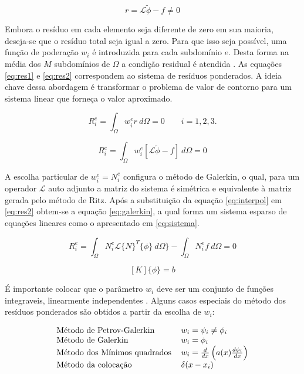\documentclass[
    12pt,               %
    openright,          %
    oneside,
    a4paper,            %
    english,            %
    french,             %
    spanish,            %
    brazil              %
    ]{abntex2}
\begin{document}
\begin{equation}
\label{eq:residuos}
r = \mathcal{L} \tilde{\phi} - f \neq 0
\end{equation}

Embora o resíduo em cada elemento seja diferente de zero em sua maioria, deseja-se que o resíduo total seja igual a zero. Para que isso seja possível, uma função de poderação $w_i$ é introduzida para cada subdomínio $e$. Desta forma na média dos $M$ subdomínios de $\Omega$ a condição residual é atendida \cite{volakis}.
As equações \ref{eq:res1} e \ref{eq:res2} correspondem ao sistema de resíduos ponderados. A ideia chave dessa abordagem é transformar o problema de valor de contorno para um sistema linear que forneça o valor aproximado. 

\begin{equation}
\label{eq:res1}
R_i^e = \int_{\Omega}{w_i^e r \ d\Omega} = 0 \qquad i = 1,2,3.
\end{equation}

\begin{equation}
\label{eq:res2}
R_i^e = \int_{\Omega}{w_i^e [\mathcal{L} \tilde{\phi} - f] \ d\Omega} = 0
\end{equation}  


A escolha particular de $w_i^e = N^e_i$ configura o método de Galerkin, o qual, para um operador $\mathcal{L}$ auto adjunto a matriz do sistema é simétrica e equivalente à matriz gerada pelo método de Ritz. Após a substituição da equação \ref{eq:interpol} em \ref{eq:res2} obtem-se a equação \ref{eq:galerkin}, a qual forma um sistema esparso de equações lineares como o apresentado em \ref{eq:sistema}.


\begin{equation}
\label{eq:galerkin}
R_i^e = \int_{\Omega}{N_i^e \mathcal{L} \{N\}^T \{\phi\} \ d\Omega\}} - \int_{\Omega}{N^e_i f \ d \Omega} = 0
\end{equation} 


\begin{equation}
\label{eq:sistema}
[K]\{\phi\} = {b}
\end{equation}  

É importante colocar que o parâmetro $w_i$ deve ser um conjunto de funções integraveis, linearmente independentes
\cite[p. 60]{reddy}. Alguns casos especiais do método dos resíduos ponderados são obtidos a partir da escolha de $w_i$:

\begin{equation}
\label{eq:metPond}
\begin{tabular}{ l l }
Método de Petrov-Galerkin & $ w_i = \psi_i \neq \phi_i $ \\ 
Método de Galerkin & $ w_i = \phi_i $\\  
Método dos Mínimos quadrados & $ w_i = \frac{d}{dx} \left(a(x)\frac{d \phi_i}{dx}\right) $ \\ 
Método da colocação & $ \delta(x - x_i)  $ 
\end{tabular}
\end{equation}
\end{document}

